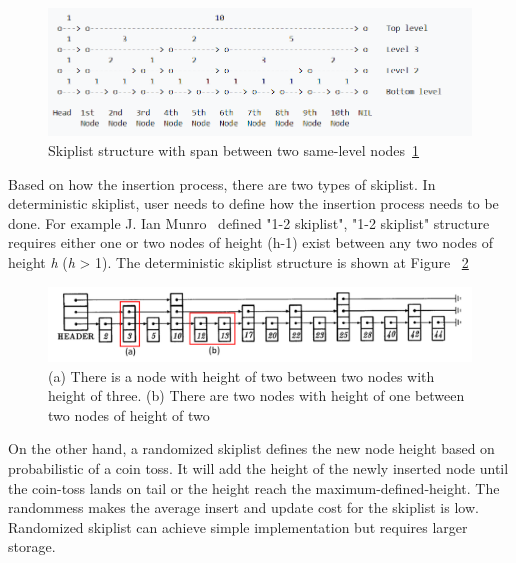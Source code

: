 \begin{figure}[H]
	\begin{center}
		\includegraphics[width=1.0\textwidth]{figures/skiplistSearch.png}
		\caption{Skiplist structure with span between two same-level nodes~\ref{fig:4_skipliststructure}} 
		\label{fig:4_skipliststructure}
	\end{center}
\end{figure}

Based on how the insertion process, there are two types of skiplist. In deterministic skiplist, user needs to define how the insertion process needs to be done. For example J. Ian Munro~\cite{deterministicSkiplist} defined "1-2 skiplist", "1-2 skiplist" structure requires either one or two nodes of height (h-1) exist between any two nodes of height {\emph{h}} ({\emph{h}} > 1). The deterministic skiplist structure is shown at Figure ~\ref{fig:5_deterministicSkiplist}

\begin{figure}[H]
	\begin{center}
		\includegraphics[width=1.0\textwidth]{figures/deterministicSkiplist.png}
		\caption{(a) There is a node with height of two between two nodes with height of three. (b) There are two nodes with height of one between two nodes of height of two~\cite{deterministicSkiplist}} 
		\label{fig:5_deterministicSkiplist}
	\end{center}
\end{figure}

On the other hand, a randomized skiplist defines the new node height based on probabilistic of a coin toss. It will add the height of the newly inserted node until the coin-toss lands on tail or the height reach the maximum-defined-height. The randommess makes the average insert and update cost for the skiplist is low. Randomized skiplist can achieve simple implementation but requires larger storage. 

